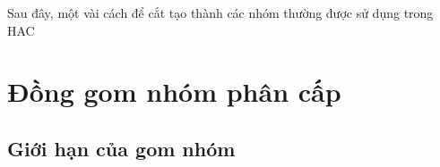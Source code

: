 Sau đây, một vài cách để cắt tạo thành các nhóm thường được sử dụng trong HAC



 
\section{Đồng gom nhóm phân cấp}

	\subsection{Giới hạn của gom nhóm}
	
